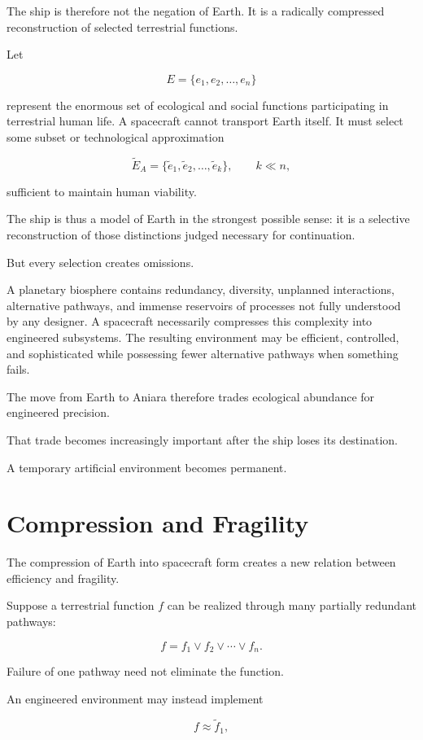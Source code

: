 \documentclass[11pt,oneside]{book}
\theoremstyle{definition}
\theoremstyle{remark}
\begin{document}
The ship is therefore not the negation of Earth. It is a radically compressed reconstruction of selected terrestrial functions.

Let

\[
E
=
\{e_1,e_2,\ldots,e_n\}
\]

represent the enormous set of ecological and social functions participating in terrestrial human life. A spacecraft cannot transport Earth itself. It must select some subset or technological approximation

\[
\widetilde E_A
=
\{\tilde e_1,\tilde e_2,\ldots,\tilde e_k\},
\qquad
k\ll n,
\]

sufficient to maintain human viability.

The ship is thus a model of Earth in the strongest possible sense: it is a selective reconstruction of those distinctions judged necessary for continuation.

But every selection creates omissions.

A planetary biosphere contains redundancy, diversity, unplanned interactions, alternative pathways, and immense reservoirs of processes not fully understood by any designer. A spacecraft necessarily compresses this complexity into engineered subsystems. The resulting environment may be efficient, controlled, and sophisticated while possessing fewer alternative pathways when something fails.

The move from Earth to Aniara therefore trades ecological abundance for engineered precision.

That trade becomes increasingly important after the ship loses its destination.

A temporary artificial environment becomes permanent.

\section{Compression and Fragility}

The compression of Earth into spacecraft form creates a new relation between efficiency and fragility.

Suppose a terrestrial function \(f\) can be realized through many partially redundant pathways:

\[
f
=
f_1\lor f_2\lor\cdots\lor f_n.
\]

Failure of one pathway need not eliminate the function.

An engineered environment may instead implement

\[
f\approx\tilde f_1,
\]
\end{document}
